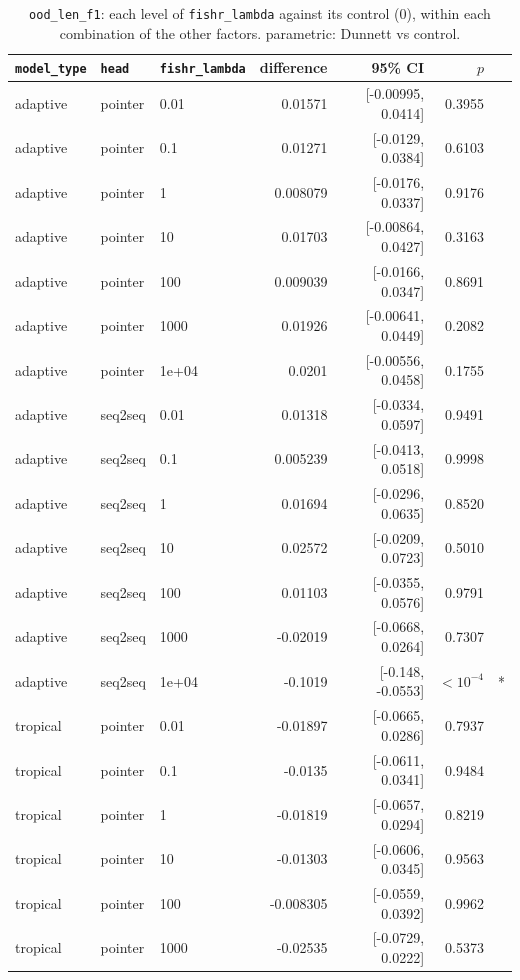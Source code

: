 \documentclass[10pt]{article}
\begin{document}
{\small
\begin{longtable}{lllrrrl}
\caption{\texttt{ood\_len\_f1}: each level of \texttt{fishr\_lambda} against its control (0), within each combination of the other factors. parametric: Dunnett vs control.}\label{tab:control-ood_len_f1}\\
\toprule
\texttt{model\_type} & \texttt{head} & \texttt{fishr\_lambda} & difference & 95\% CI & $p$ & \\
\midrule
\endhead
adaptive & pointer & 0.01 & 0.01571 & [-0.00995, 0.0414] & 0.3955 & \\
adaptive & pointer & 0.1 & 0.01271 & [-0.0129, 0.0384] & 0.6103 & \\
adaptive & pointer & 1 & 0.008079 & [-0.0176, 0.0337] & 0.9176 & \\
adaptive & pointer & 10 & 0.01703 & [-0.00864, 0.0427] & 0.3163 & \\
adaptive & pointer & 100 & 0.009039 & [-0.0166, 0.0347] & 0.8691 & \\
adaptive & pointer & 1000 & 0.01926 & [-0.00641, 0.0449] & 0.2082 & \\
adaptive & pointer & 1e+04 & 0.0201 & [-0.00556, 0.0458] & 0.1755 & \\
adaptive & seq2seq & 0.01 & 0.01318 & [-0.0334, 0.0597] & 0.9491 & \\
adaptive & seq2seq & 0.1 & 0.005239 & [-0.0413, 0.0518] & 0.9998 & \\
adaptive & seq2seq & 1 & 0.01694 & [-0.0296, 0.0635] & 0.8520 & \\
adaptive & seq2seq & 10 & 0.02572 & [-0.0209, 0.0723] & 0.5010 & \\
adaptive & seq2seq & 100 & 0.01103 & [-0.0355, 0.0576] & 0.9791 & \\
adaptive & seq2seq & 1000 & -0.02019 & [-0.0668, 0.0264] & 0.7307 & \\
adaptive & seq2seq & 1e+04 & -0.1019 & [-0.148, -0.0553] & $<10^{-4}$ & *\\
tropical & pointer & 0.01 & -0.01897 & [-0.0665, 0.0286] & 0.7937 & \\
tropical & pointer & 0.1 & -0.0135 & [-0.0611, 0.0341] & 0.9484 & \\
tropical & pointer & 1 & -0.01819 & [-0.0657, 0.0294] & 0.8219 & \\
tropical & pointer & 10 & -0.01303 & [-0.0606, 0.0345] & 0.9563 & \\
tropical & pointer & 100 & -0.008305 & [-0.0559, 0.0392] & 0.9962 & \\
tropical & pointer & 1000 & -0.02535 & [-0.0729, 0.0222] & 0.5373 & \\

\end{longtable}}
\end{document}
